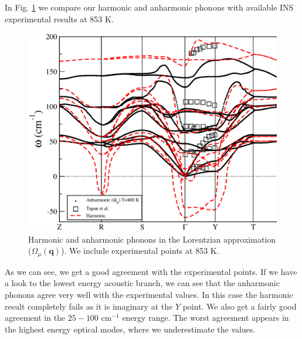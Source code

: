 In Fig. \ref{phonon-exp} we compare our harmonic and anharmonic phonons with available INS experimental results\cite{chatterji2018soft} at 853 K. 
\begin{figure}[h]
\includegraphics[width=\linewidth]{Figures/exp-vs-theory.eps}
\caption[Comparison of phonons in the Lorentzian approximation and INS experiments.]{Harmonic and anharmonic phonons in the Lorentzian approximation ($\Omega_{\mu}(\mathbf{q})$). We include experimental points\cite{chatterji2018soft} 
at 853 K.}
\label{phonon-exp}
\end{figure}
As we can see, we get a good agreement with the experimental points. If we have a look to the lowest energy acoustic branch, we can see that the anharmonic phonons agree very well with the experimental values. In this case the harmonic result completely fails as it is imaginary at the $Y$ point. We also get a fairly good agreement in the $25-100$ cm$^{-1}$ energy range. The worst agreement appears in the highest energy optical modes, where we underestimate the values. \\

